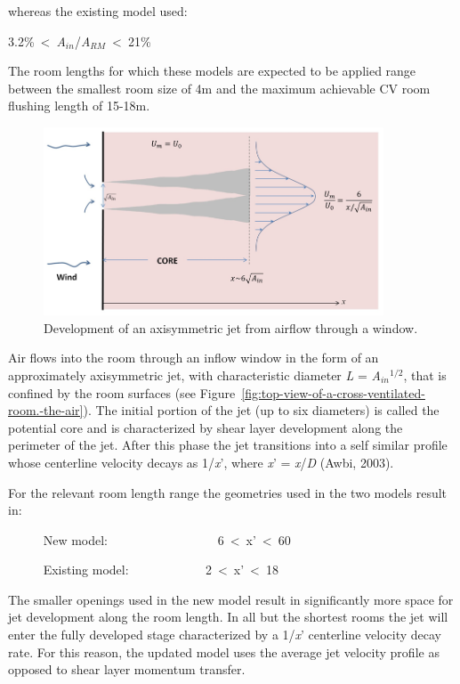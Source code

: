 {whereas the existing model used:

3.2\%~\textless{}~\emph{A}\(_{in}\)/\emph{A}\(_{RM}\)~\textless{}~21\%

The room lengths for which these models are expected to be applied range between the smallest room size of 4m and the maximum achievable CV room flushing length of 15-18m.

\begin{figure}[hbtp] %
\centering
\includegraphics[width=0.9\textwidth, height=0.9\textheight, keepaspectratio=true]{media/image2622.png}
\caption{Development of an axisymmetric jet from airflow through a window. \protect \label{fig:development-of-an-axisymmetric-jet-from}}
\end{figure}

Air flows into the room through an inflow window in the form of an approximately axisymmetric jet, with characteristic diameter \emph{L} = \emph{A}\(_{in}\)\(^{1/2}\), that is confined by the room surfaces (see Figure~\ref{fig:top-view-of-a-cross-ventilated-room.-the-air}). The initial portion of the jet (up to six diameters) is called the potential core and is characterized by shear layer development along the perimeter of the jet. After this phase the jet transitions into a self similar profile whose centerline velocity decays as 1/\emph{x}', where \emph{x}' = \emph{x}/\emph{D} (Awbi, 2003).

For the relevant room length range the geometries used in the two models result in:

~~~~~ New model:~~~~~~~~~~~~~~~~~ 6~\textless{}~x'~\textless{}~60

~~~~~ Existing model: ~~~~~~~~~~~ 2~\textless{}~x'~\textless{}~18

The smaller openings used in the new model result in significantly more space for jet development along the room length. In all but the shortest rooms the jet will enter the fully developed stage characterized by a 1/\emph{x}' centerline velocity decay rate. For this reason, the updated model uses the average jet velocity profile as opposed to shear layer momentum transfer.

}
